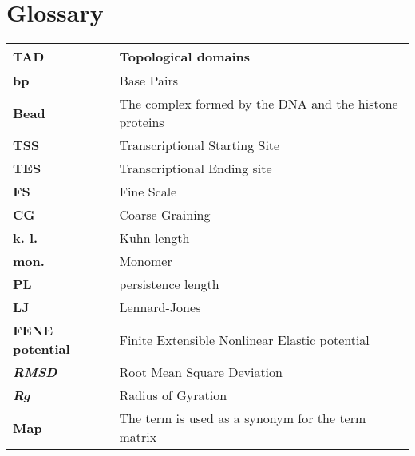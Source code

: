 \section{Glossary} \label{chap: term explanation}

\small{\begin{table}[H]
\begin{tabular}{|l|l|}
\hline
\textbf{TAD} & Topological domains \\
\hline
\textbf{bp} & Base Pairs \\
\hline
\textbf{Bead} & The complex formed by the DNA and the histone proteins \\
\hline
\textbf{TSS} & Transcriptional Starting Site \\
\hline
\textbf{TES} & Transcriptional Ending site \\
\hline
\textbf{FS} & Fine Scale \\
\hline
\textbf{CG} & Coarse Graining \\
\hline
\textbf{k. l.} & Kuhn length\\
\hline
\textbf{mon.} & Monomer\\
\hline
\textbf{PL} & persistence length\\
\hline
\textbf{LJ} & Lennard-Jones\\
\hline
\textbf{FENE potential} & Finite Extensible Nonlinear Elastic potential\\
\hline
\textbf{\textit{RMSD}} & Root Mean Square Deviation\\
\hline
\textbf{\textit{Rg}} & Radius of Gyration\\
\hline
\textbf{Map} & The term is used as a synonym for the term matrix\\
\hline
\end{tabular}
\end{table}}